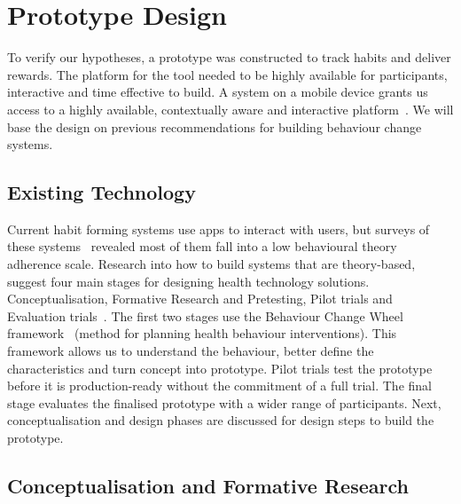 
\newpage
\section{Prototype Design}

To verify our hypotheses, a prototype was constructed to track habits and deliver rewards. The platform for the tool needed to be highly available for participants, interactive and time effective to build.
A system on a mobile device grants us access to a highly available, contextually aware and interactive platform~\cite{article_my_phone_is_part_of_my_soul, article_mhealth}. We will base the design on previous recommendations for building behaviour change systems.

\subsection{Existing Technology}

Current habit forming systems use apps to interact with users, but surveys of these systems~\cite{survey_on_apps_2,survey_on_current_apps_of_steel, article_mhealth} revealed most of them fall into a low behavioural theory adherence scale.
Research into how to build systems that are theory-based, suggest four main stages for designing health technology solutions. Conceptualisation, Formative Research and Pretesting,
Pilot trials and Evaluation trials~\cite{article_mhealth}. The first two stages use the Behaviour Change Wheel framework~\cite{article_behaviour_change_wheel}
(method for planning health behaviour interventions). This framework allows us to understand the behaviour, better define the characteristics and turn concept into prototype.
Pilot trials test the prototype before it is production-ready without the commitment of a full trial. The final stage evaluates the finalised prototype with a wider range of participants. Next, conceptualisation and design phases are discussed for design steps to build the prototype.

\subsection*{Conceptualisation and Formative Research}

